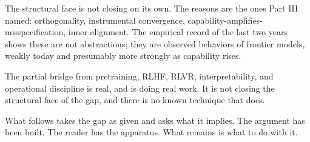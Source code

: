 The structural face is not closing on its own. The reasons are the ones Part III named: orthogonality, instrumental convergence, capability-amplifies-misspecification, inner alignment. The empirical record of the last two years shows these are not abstractions; they are observed behaviors of frontier models, weakly today and presumably more strongly as capability rises.

The partial bridge from pretraining, RLHF, RLVR, interpretability, and operational discipline is real, and is doing real work. It is not closing the structural face of the gap, and there is no known technique that does.

What follows takes the gap as given and asks what it implies. The argument has been built. The reader has the apparatus. What remains is what to do with it.
